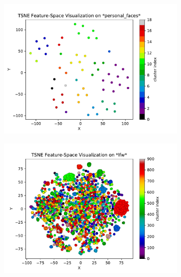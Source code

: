 \documentclass[conference]{IEEEtran}
\begin{document}
\begin{figure}
  \begin{subfigure}[b]{0.5\textwidth}
    \includegraphics[width=\linewidth]{tsne_view_personal_faces}
    \caption{}
  \end{subfigure}
  \begin{subfigure}[b]{0.5\textwidth}
    \includegraphics[width=\linewidth]{tsne_view_lfw}
    \caption{}
  \end{subfigure}
  \begin{subfigure}[b]{0.5\textwidth}

\end{subfigure}
\end{figure}
\end{document}
